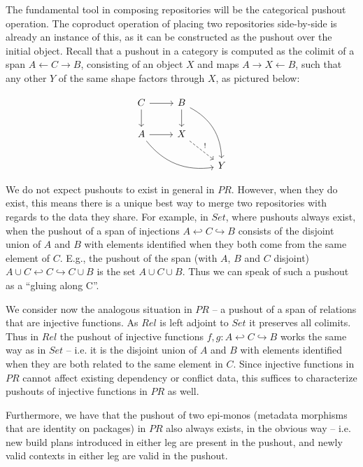 \documentclass[hoptionsi,review,screen,format=sigconf]{acmart}
\theoremstyle{definition}
\newcommand{\PRb}{\mathit{PR}}
\newcommand{\Relb}{\mathit{Rel}}
\newcommand{\Setb}{\mathit{Set}}
\begin{document}
The fundamental tool in composing repositories will be the categorical pushout operation. The coproduct operation of placing two repositories side-by-side is already an instance of this, as it can be constructed as the pushout over the initial object. Recall that a pushout in a category is computed as the colimit of a span \(A \leftarrow C \rightarrow B\), consisting of an object \(X\) and maps \(A \rightarrow X \leftarrow B\), such that any other \(Y\) of the same shape factors through \(X\), as pictured below:

\begin{equation*}
\begin{tikzcd}
C \arrow[d] \arrow[r]               & B \arrow[d] \arrow[rdd, bend left] &   \\
A \arrow[r] \arrow[rrd, bend right] & X \arrow[rd, "!", dashed]          &   \\
                                    &                                    & Y
\end{tikzcd}
\end{equation*}

We do not expect pushouts to exist in general in \(\PRb\). However, when they do exist, this means there is a unique best way to merge two repositories with regards to the data they share. For example, in \(\Setb\), where pushouts always exist, when the pushout of a span of injections \(A \hookleftarrow C \hookrightarrow B\) consists of the disjoint union of \(A\) and \(B\) with elements identified when they both come from the same element of \(C\). E.g., the pushout of the span (with \(A\), \(B\) and \(C\) disjoint) \(A \cup C \hookleftarrow C \hookrightarrow C \cup B\) is the set \(A \cup C \cup B\). Thus we can speak of such a pushout as a ``gluing along C''. 

We consider now the analogous situation in \(\PRb\) -- a pushout of a span of relations that are injective functions. As \(\Relb\) is left adjoint to \(\Setb\) it preserves all colimits. Thus in \(Rel\) the pushout of injective functions \(f, g : A \hookleftarrow C \hookrightarrow B\) works the same way as in \(\Setb\) -- i.e. it is the disjoint union of \(A\) and \(B\) with elements identified when they are both related to the same element in \(C\). Since injective functions in \(\PRb\) cannot affect existing dependency or conflict data, this suffices to characterize pushouts of injective functions in \(\PRb\) as well.

Furthermore, we have that the pushout of two epi-monos (metadata morphisms that are identity on packages) in \(\PRb\) also always exists, in the obvious way -- i.e. new build plans introduced in either leg are present in the pushout, and newly valid contexts in either leg are valid in the pushout. 
\end{document}
